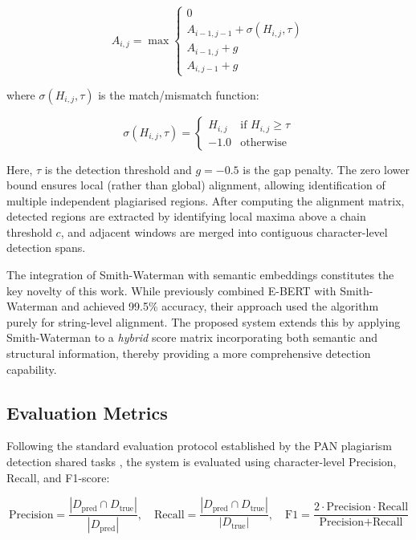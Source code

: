 \documentclass[12pt, a4paper]{article}
\begin{document}
\begin{equation}
	A_{i,j} = \max \begin{cases}
		0 \\
		A_{i-1,j-1} + \sigma(H_{i,j}, \tau) \\
		A_{i-1,j} + g \\
		A_{i,j-1} + g
	\end{cases}
	\label{eq:smithwaterman}
\end{equation}

\noindent where $\sigma(H_{i,j}, \tau)$ is the match/mismatch function:

\begin{equation}
	\sigma(H_{i,j}, \tau) = \begin{cases}
		H_{i,j} & \text{if } H_{i,j} \geq \tau \\
		-1.0    & \text{otherwise}
	\end{cases}
	\label{eq:matchfunc}
\end{equation}

Here, $\tau$ is the detection threshold and $g = -0.5$ is the gap penalty. The zero lower bound ensures local (rather than global) alignment, allowing identification of multiple independent plagiarised regions. After computing the alignment matrix, detected regions are extracted by identifying local maxima above a chain threshold $c$, and adjacent windows are merged into contiguous character-level detection spans.

The integration of Smith-Waterman with semantic embeddings constitutes the key novelty of this work. While \citet{Antonius2023} previously combined E-BERT with Smith-Waterman and achieved 99.5\% accuracy, their approach used the algorithm purely for string-level alignment. The proposed system extends this by applying Smith-Waterman to a \textit{hybrid} score matrix incorporating both semantic and structural information, thereby providing a more comprehensive detection capability.

\subsection{Evaluation Metrics}

Following the standard evaluation protocol established by the PAN plagiarism detection shared tasks \citep{GreinerPetter2025}, the system is evaluated using character-level Precision, Recall, and F1-score:

\begin{equation}
	\text{Precision} = \frac{|D_{\text{pred}} \cap D_{\text{true}}|}{|D_{\text{pred}}|}, \quad
	\text{Recall} = \frac{|D_{\text{pred}} \cap D_{\text{true}}|}{|D_{\text{true}}|}, \quad
	\text{F1} = \frac{2 \cdot \text{Precision} \cdot \text{Recall}}{\text{Precision} + \text{Recall}}
	\label{eq:metrics}
\end{equation}
\end{document}
